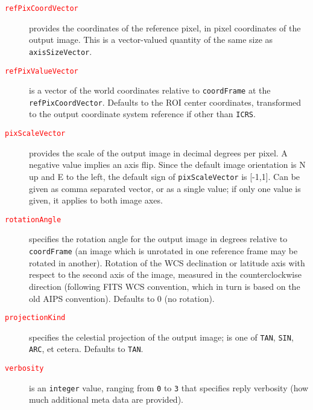 \begin{description}
		\item[\textcolor{red}{\texttt{refPixCoordVector}}] provides the
        coordinates of the reference pixel, in pixel coordinates of the
        output image. This is a vector-valued quantity of the same size
        as \texttt{axisSizeVector}.
		
		\item[\textcolor{red}{\texttt{refPixValueVector}}] is a vector
        of the world coordinates relative to \texttt{coordFrame} at the
        \texttt{refPixCoordVector}. Defaults to the ROI center
        coordinates, transformed to the output coordinate system
        reference if other than \texttt{ICRS}.
		
		\item[\textcolor{red}{\texttt{pixScaleVector}}] provides the
        scale of the output image in decimal degrees per pixel. A
        negative value implies an axis flip. Since the default image
        orientation is N up and E to the left, the default sign of
        \texttt{pixScaleVector} is [-1,1]. Can be given as comma
        separated vector, or as a single value; if only one value is
        given, it applies to both image axes.
		
		\item[\textcolor{red}{\texttt{rotationAngle}}] specifies the
        rotation angle for the output image in degrees relative to
        \texttt{coordFrame} (an image which is unrotated in one
        reference frame may be rotated in another). Rotation of the WCS
        declination or latitude axis with respect to the second axis of
        the image, measured in the counterclockwise direction (following
        FITS WCS convention, which in turn is based on the old AIPS
        convention). Defaults to 0 (no rotation).
		
		\item[\textcolor{red}{\texttt{projectionKind}}] specifies the
        celestial projection of the output image; is one of
        \texttt{TAN}, \texttt{SIN}, \texttt{ARC}, et cetera. Defaults to
        \texttt{TAN}.
		
		\item[\textcolor{red}{\texttt{verbosity}}] is an
        \texttt{integer} value, ranging from \texttt{0} to \texttt{3}
        that specifies reply verbosity (how much additional meta data
        are provided).
		
	\end{description}
	
